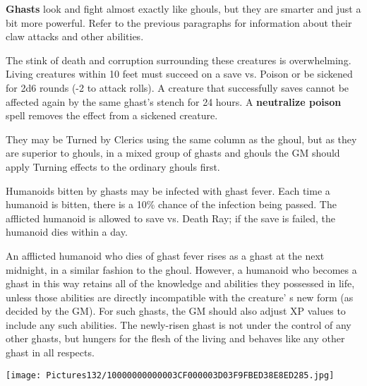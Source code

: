 \documentclass[a4paper,twoside,openany,10pt]{book}
\begin{document}
\begin{multicols}{2}
\textbf{Ghasts} look and fight almost exactly like ghouls, but they are smarter and just a bit more powerful. Refer to the previous paragraphs for information about their claw attacks and other abilities.

The stink of death and corruption surrounding these creatures is overwhelming. Living creatures within 10 feet must succeed on a save vs. Poison or be sickened for 2d6 rounds (-2 to attack rolls). A creature that successfully saves cannot be affected again by the same ghast's stench for 24 hours. A \textbf{neutralize poison} spell removes the effect from a sickened creature.

They may be Turned by Clerics using the same column as the ghoul, but as they are superior to ghouls, in a mixed group of ghasts and ghouls the GM should apply Turning effects to the ordinary ghouls first.

Humanoids bitten by ghasts may be infected with ghast fever. Each time a humanoid is bitten, there is a 10\% chance of the infection being passed. The afflicted humanoid is allowed to save vs. Death Ray; if the save is failed, the humanoid dies within a day.

An afflicted humanoid who dies of ghast fever rises as a ghast at the next midnight, in a similar fashion to the ghoul. However, a humanoid who becomes a ghast in this way retains all of the knowledge and abilities they possessed in life, unless those abilities are directly incompatible with the creature' s new form (as decided by the GM). For such ghasts, the GM should also adjust XP values to include any such abilities. The newly-risen ghast is not under the control of any other ghasts, but hungers for the flesh of the living and behaves like any other ghast in all respects.

\end{multicols}

\begin{center}
	\texttt{[image: Pictures132/10000000000003CF000003D03F9FBED38E8ED285.jpg]}
\end{center}
\end{document}
